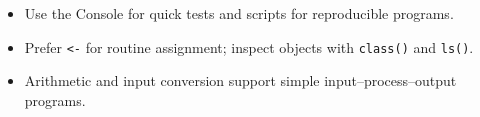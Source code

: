 \begin{chapterrecap}
\begin{itemize}
  \item Use the Console for quick tests and scripts for reproducible programs.
  \item Prefer \texttt{<-} for routine assignment; inspect objects with \texttt{class()} and \texttt{ls()}.
  \item Arithmetic and input conversion support simple input--process--output programs.
\end{itemize}
\end{chapterrecap}

